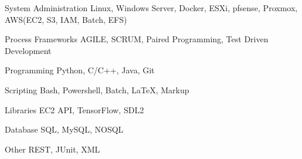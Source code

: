 
\begin{cvskills}

  \cvskill
    {System Administration} %
    {Linux, Windows Server, Docker, ESXi, pfsense, Proxmox, AWS(EC2, S3, IAM, Batch, EFS)} %

  \cvskill
    {Process Frameworks} %
    {AGILE, SCRUM, Paired Programming, Test Driven Development} %

  \cvskill
    {Programming} %
    {Python, C/C++, Java, Git} %

  \cvskill
    {Scripting} %
    {Bash, Powershell, Batch, LaTeX, Markup} %

  \cvskill
    {Libraries} %
    {EC2 API, TensorFlow, SDL2} %
    
  \cvskill
    {Database} %
    {SQL, MySQL, NOSQL} %
    
  \cvskill
    {Other} %
    {REST, JUnit, XML} %
    
\end{cvskills}
